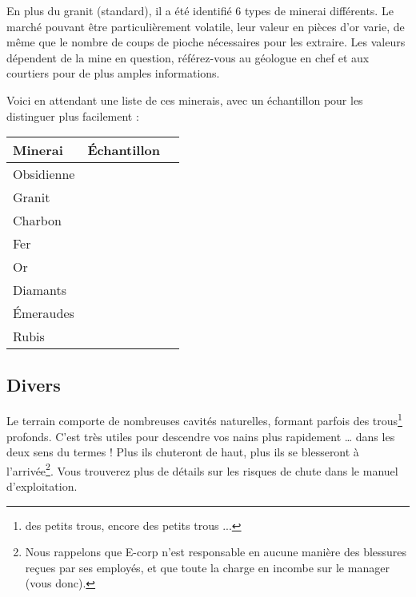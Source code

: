   En plus du granit (standard), il a été identifié 6 types de minerai
  différents.  Le marché pouvant être particulièrement volatile, leur valeur en
  pièces d'or varie, de même que le nombre de coups de pioche nécessaires pour
  les extraire. Les valeurs dépendent de la mine en question, référez-vous au
  géologue en chef et aux courtiers pour de plus amples informations.

  Voici en attendant une liste de ces minerais, avec un échantillon pour les
  distinguer plus facilement :
  \begin{center}
    \begin{tabular}{|l|Sc|}
      \hline
      Minerai & Échantillon \\
      \hline
      Obsidienne &  \\
      \hline
      Granit &  \\
      \hline
      Charbon &  \\
      \hline
      Fer &  \\
      \hline
      Or &  \\
      \hline
      Diamants &  \\
      \hline
      Émeraudes &  \\
      \hline
      Rubis &  \\
      \hline
    \end{tabular}
  \end{center}

\subsection{Divers}

  Le terrain comporte de nombreuses cavités naturelles, formant parfois des
  trous\footnote{des petits trous, encore des petits trous ...} profonds. C'est
  très utiles pour descendre vos nains plus rapidement \ldots{} dans les
  deux sens du termes ! Plus ils chuteront de haut, plus ils se blesseront à
  l'arrivée\footnote{Nous rappelons que E-corp n'est responsable en aucune
  manière des blessures reçues par ses employés, et que toute la charge en
  incombe sur le manager (vous donc).}. Vous trouverez plus de détails
  sur les risques de chute dans le manuel d'exploitation.

